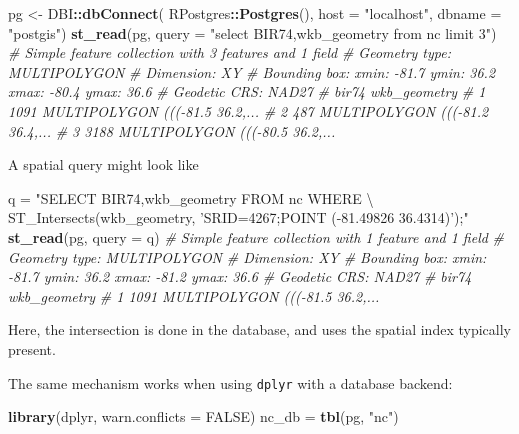 \documentclass[]{book}
\newenvironment{Shaded}{\begin{snugshade}}{\end{snugshade}}
\newcommand{\CommentTok}[1]{\textcolor[rgb]{0.56,0.35,0.01}{\textit{#1}}}
\newcommand{\DataTypeTok}[1]{\textcolor[rgb]{0.13,0.29,0.53}{#1}}
\newcommand{\KeywordTok}[1]{\textcolor[rgb]{0.13,0.29,0.53}{\textbf{#1}}}
\newcommand{\NormalTok}[1]{#1}
\newcommand{\OperatorTok}[1]{\textcolor[rgb]{0.81,0.36,0.00}{\textbf{#1}}}
\newcommand{\OtherTok}[1]{\textcolor[rgb]{0.56,0.35,0.01}{#1}}
\newcommand{\StringTok}[1]{\textcolor[rgb]{0.31,0.60,0.02}{#1}}
\begin{document}
\begin{Shaded}
\begin{Highlighting}[]
\NormalTok{pg <-}\StringTok{ }\NormalTok{DBI}\OperatorTok{::}\KeywordTok{dbConnect}\NormalTok{(}
\NormalTok{    RPostgres}\OperatorTok{::}\KeywordTok{Postgres}\NormalTok{(),}
    \DataTypeTok{host =} \StringTok{"localhost"}\NormalTok{,}
    \DataTypeTok{dbname =} \StringTok{"postgis"}\NormalTok{)}
\KeywordTok{st_read}\NormalTok{(pg, }\DataTypeTok{query =} \StringTok{"select BIR74,wkb_geometry from nc limit 3"}\NormalTok{)}
\CommentTok{# Simple feature collection with 3 features and 1 field}
\CommentTok{# Geometry type: MULTIPOLYGON}
\CommentTok{# Dimension:     XY}
\CommentTok{# Bounding box:  xmin: -81.7 ymin: 36.2 xmax: -80.4 ymax: 36.6}
\CommentTok{# Geodetic CRS:  NAD27}
\CommentTok{#   bir74                   wkb_geometry}
\CommentTok{# 1  1091 MULTIPOLYGON (((-81.5 36.2,...}
\CommentTok{# 2   487 MULTIPOLYGON (((-81.2 36.4,...}
\CommentTok{# 3  3188 MULTIPOLYGON (((-80.5 36.2,...}
\end{Highlighting}
\end{Shaded}

A spatial query might look like

\begin{Shaded}
\begin{Highlighting}[]
\NormalTok{q =}\StringTok{ "SELECT BIR74,wkb_geometry FROM nc WHERE \textbackslash{}}
\StringTok{  ST_Intersects(wkb_geometry, 'SRID=4267;POINT (-81.49826 36.4314)');"}
\KeywordTok{st_read}\NormalTok{(pg, }\DataTypeTok{query =}\NormalTok{ q)}
\CommentTok{# Simple feature collection with 1 feature and 1 field}
\CommentTok{# Geometry type: MULTIPOLYGON}
\CommentTok{# Dimension:     XY}
\CommentTok{# Bounding box:  xmin: -81.7 ymin: 36.2 xmax: -81.2 ymax: 36.6}
\CommentTok{# Geodetic CRS:  NAD27}
\CommentTok{#   bir74                   wkb_geometry}
\CommentTok{# 1  1091 MULTIPOLYGON (((-81.5 36.2,...}
\end{Highlighting}
\end{Shaded}

Here, the intersection is done in the database, and uses the spatial
index typically present.

The same mechanism works when using \texttt{dplyr} with a database backend:

\begin{Shaded}
\begin{Highlighting}[]
\KeywordTok{library}\NormalTok{(dplyr, }\DataTypeTok{warn.conflicts =} \OtherTok{FALSE}\NormalTok{)}
\NormalTok{nc_db =}\StringTok{ }\KeywordTok{tbl}\NormalTok{(pg, }\StringTok{"nc"}\NormalTok{)}
\end{Highlighting}
\end{Shaded}
\end{document}
